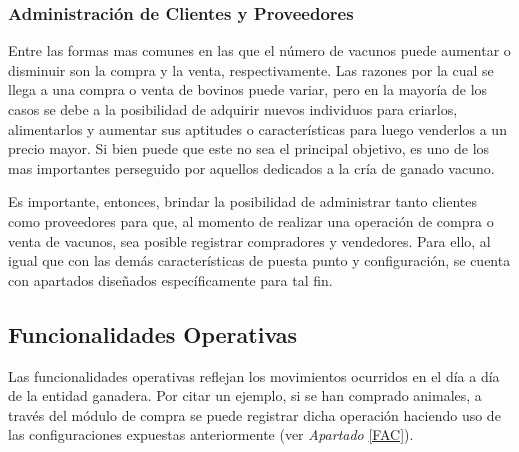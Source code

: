 \documentclass[11pt,oneside]{book}
\begin{document}
\subsubsection{Administración de Clientes y Proveedores}
Entre las formas mas comunes en las que el número de vacunos puede aumentar o disminuir son la compra y la venta, respectivamente. Las razones por la cual se llega a una compra o venta de bovinos puede variar, pero en la mayoría de los casos se debe a la posibilidad de adquirir nuevos individuos para criarlos, alimentarlos y aumentar sus aptitudes o características para luego venderlos a un precio mayor. Si bien puede que este no sea el principal objetivo, es uno de los mas importantes perseguido por aquellos dedicados a la cría de ganado vacuno.

Es importante, entonces, brindar la posibilidad de administrar tanto clientes como proveedores para que, al momento de realizar una operación de compra o venta de vacunos, sea posible registrar compradores y vendedores. Para ello, al igual que con las demás características de puesta punto y configuración, se cuenta con apartados diseñados específicamente para tal fin.

%
%
%

\subsection{Funcionalidades Operativas}\label{FO}
Las funcionalidades operativas reflejan los movimientos ocurridos en el día a día de la entidad ganadera. Por citar un ejemplo, si se han comprado animales, a través del módulo de compra se puede registrar dicha operación haciendo uso de las configuraciones expuestas anteriormente (ver \textit{Apartado} \eqref{FAC}).
\end{document}
